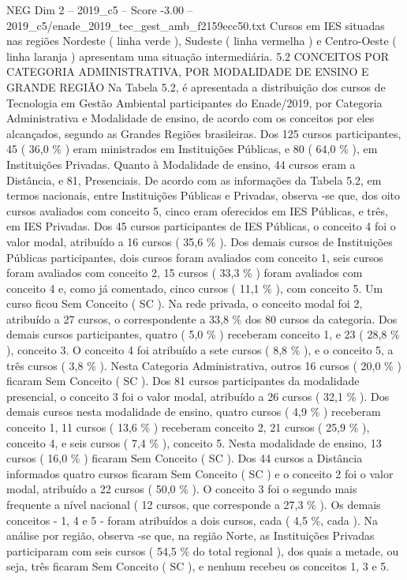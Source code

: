 \begin{textsample}{NEG Dim 2 – 2019\_c5 – Score -3.00 – 2019\_c5/enade\_2019\_tec\_gest\_amb\_f2159ecc50.txt}
Cursos em IES situadas nas regiões Nordeste ( linha verde ), Sudeste ( linha vermelha ) e Centro-Oeste ( linha laranja ) apresentam uma situação intermediária. 5.2 CONCEITOS POR CATEGORIA ADMINISTRATIVA, POR MODALIDADE DE ENSINO E GRANDE REGIÃO Na Tabela 5.2, é apresentada a distribuição dos cursos de Tecnologia em Gestão Ambiental participantes do Enade/2019, por Categoria Administrativa e Modalidade de ensino, de acordo com os conceitos por eles alcançados, segundo as Grandes Regiões brasileiras.
Dos 125 cursos participantes, 45 ( 36,0 \% ) eram ministrados em Instituições Públicas, e 80 ( 64,0 \% ), em Instituições Privadas.
Quanto à Modalidade de ensino, 44 cursos eram a Distância, e 81, Presenciais.
De acordo com as informações da Tabela 5.2, em termos nacionais, entre Instituições Públicas e Privadas, observa -se que, dos oito cursos avaliados com conceito 5, cinco eram oferecidos em IES Públicas, e três, em IES Privadas.
Dos 45 cursos participantes de IES Públicas, o conceito 4 foi o valor modal, atribuído a 16 cursos ( 35,6 \% ).
Dos demais cursos de Instituições Públicas participantes, dois cursos foram avaliados com conceito 1, seis cursos foram avaliados com conceito 2, 15 cursos ( 33,3 \% ) foram avaliados com conceito 4 e, como já comentado, cinco cursos ( 11,1 \% ), com conceito 5.
Um curso ficou Sem Conceito ( SC ).
Na rede privada, o conceito modal foi 2, atribuído a 27 cursos, o correspondente a 33,8 \% dos 80 cursos da categoria.
Dos demais cursos participantes, quatro ( 5,0 \% ) receberam conceito 1, e 23 ( 28,8 \% ), conceito 3.
O conceito 4 foi atribuído a sete cursos ( 8,8 \% ), e o conceito 5, a três cursos ( 3,8 \% ).
Nesta Categoria Administrativa, outros 16 cursos ( 20,0 \% ) ficaram Sem Conceito ( SC ).
Dos 81 cursos participantes da modalidade presencial, o conceito 3 foi o valor modal, atribuído a 26 cursos ( 32,1 \% ).
Dos demais cursos nesta modalidade de ensino, quatro cursos ( 4,9 \% ) receberam conceito 1, 11 cursos ( 13,6 \% ) receberam conceito 2, 21 cursos ( 25,9 \% ), conceito 4, e seis cursos ( 7,4 \% ), conceito 5.
Nesta modalidade de ensino, 13 cursos ( 16,0 \% ) ficaram Sem Conceito ( SC ).
Dos 44 cursos a Distância informados quatro cursos ficaram Sem Conceito ( SC ) e o conceito 2 foi o valor modal, atribuído a 22 cursos ( 50,0 \% ).
O conceito 3 foi o segundo mais frequente a nível nacional ( 12 cursos, que corresponde a 27,3 \% ).
Os demais conceitos - 1, 4 e 5 - foram atribuídos a dois cursos, cada ( 4,5 \%, cada ).
Na análise por região, observa -se que, na região Norte, as Instituições Privadas participaram com seis cursos ( 54,5 \% do total regional ), dos quais a metade, ou seja, três ficaram Sem Conceito ( SC ), e nenhum recebeu os conceitos 1, 3 e 5.

\end{textsample}

